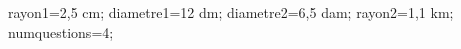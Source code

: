 \documentclass[exercice]{thedocument}%
\begin{document}
%
    \>rayon1=2,5 cm;%
    \>diametre1=12 dm;%
    \>diametre2=6,5 dam;%
    \>rayon2=1,1 km;%
    \>numquestions=4;%
\end{document}
